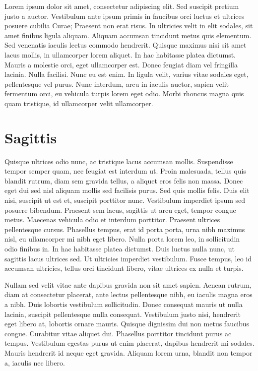 
Lorem ipsum dolor sit amet, consectetur adipiscing elit. Sed suscipit pretium justo a auctor. Vestibulum ante ipsum primis in faucibus orci luctus et ultrices posuere cubilia Curae; Praesent non erat risus. In ultricies velit in elit sodales, sit amet finibus ligula aliquam. Aliquam accumsan tincidunt metus quis elementum. Sed venenatis iaculis lectus commodo hendrerit. Quisque maximus nisi sit amet lacus mollis, in ullamcorper lorem aliquet. In hac habitasse platea dictumst. Mauris a molestie orci, eget ullamcorper est. Donec feugiat diam vel fringilla lacinia. Nulla facilisi. Nunc eu est enim. In ligula velit, varius vitae sodales eget, pellentesque vel purus. Nunc interdum, arcu in iaculis auctor, sapien velit fermentum orci, eu vehicula turpis lorem eget odio. Morbi rhoncus magna quis quam tristique, id ullamcorper velit ullamcorper.

\section{Sagittis}

Quisque ultrices odio nunc, ac tristique lacus accumsan mollis. Suspendisse tempor semper quam, nec feugiat est interdum ut. Proin malesuada, tellus quis blandit rutrum, diam sem gravida tellus, a aliquet eros felis non massa. Donec eget dui sed nisl aliquam mollis sed facilisis purus. Sed quis mollis felis. Duis elit nisi, suscipit ut est et, suscipit porttitor nunc. Vestibulum imperdiet ipsum sed posuere bibendum. Praesent sem lacus, sagittis ut arcu eget, tempor congue metus. Maecenas vehicula odio et interdum porttitor. Praesent ultrices pellentesque cursus. Phasellus tempus, erat id porta porta, urna nibh maximus nisl, eu ullamcorper mi nibh eget libero. Nulla porta lorem leo, in sollicitudin odio finibus in. In hac habitasse platea dictumst. Duis luctus nulla nunc, ut sagittis lacus ultrices sed. Ut ultricies imperdiet vestibulum. Fusce tempus, leo id accumsan ultricies, tellus orci tincidunt libero, vitae ultrices ex nulla et turpis.

Nullam sed velit vitae ante dapibus gravida non sit amet sapien. Aenean rutrum, diam at consectetur placerat, ante lectus pellentesque nibh, eu iaculis magna eros a nibh. Duis lobortis vestibulum sollicitudin. Donec consequat mauris ut nulla lacinia, suscipit pellentesque nulla consequat. Vestibulum justo nisi, hendrerit eget libero at, lobortis ornare mauris. Quisque dignissim dui non metus faucibus congue. Curabitur vitae aliquet dui. Phasellus porttitor tincidunt purus ac tempus. Vestibulum egestas purus ut enim placerat, dapibus hendrerit mi sodales. Mauris hendrerit id neque eget gravida. Aliquam lorem urna, blandit non tempor a, iaculis nec libero.

